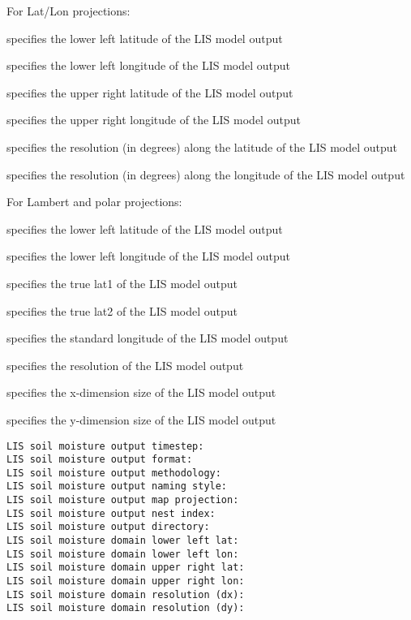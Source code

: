   

  

 For Lat/Lon projections:

 specifies the lower left latitude of the LIS model output

 specifies the lower left longitude of the LIS model output

 specifies the upper right latitude of the LIS model output

 specifies the upper right longitude of the LIS model output

 specifies the resolution (in degrees) along the latitude of the
 LIS model output

 specifies the resolution (in degrees) along the longitude of the
 LIS model output

 For Lambert and polar projections:

 specifies the lower left latitude of the LIS model output

 specifies the lower left longitude of the LIS model output

 specifies the true lat1 of the LIS model output

 specifies the true lat2 of the LIS model output

 specifies the standard longitude of the LIS model output

 specifies the resolution of the LIS model output

 specifies the x-dimension size of the LIS model output

 specifies the y-dimension size of the LIS model output
 

 \begin{Verbatim}[frame=single]
LIS soil moisture output timestep:
LIS soil moisture output format:
LIS soil moisture output methodology:
LIS soil moisture output naming style:
LIS soil moisture output map projection:
LIS soil moisture output nest index:
LIS soil moisture output directory:
LIS soil moisture domain lower left lat:
LIS soil moisture domain lower left lon:
LIS soil moisture domain upper right lat:
LIS soil moisture domain upper right lon:
LIS soil moisture domain resolution (dx):
LIS soil moisture domain resolution (dy):
 \end{Verbatim}

